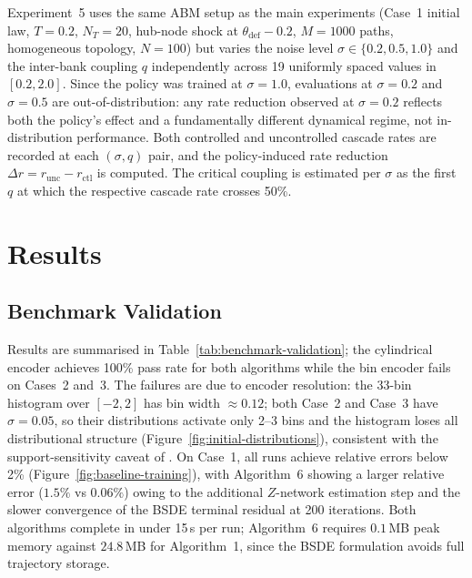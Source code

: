 \documentclass[11pt]{article}
\begin{document}
Experiment~5 uses the same ABM setup as the main experiments (Case~1 initial law, $T = 0.2$, $N_T = 20$, hub-node shock at $\theta_{\mathrm{def}} - 0.2$, $M = 1000$ paths, homogeneous topology, $N = 100$) but varies the noise level $\sigma \in \{0.2, 0.5, 1.0\}$ and the inter-bank coupling $q$ independently across 19 uniformly spaced values in $[0.2, 2.0]$. Since the policy was trained at $\sigma = 1.0$, evaluations at $\sigma = 0.2$ and $\sigma = 0.5$ are out-of-distribution: any rate reduction observed at $\sigma = 0.2$ reflects both the policy's effect and a fundamentally different dynamical regime, not in-distribution performance. Both controlled and uncontrolled cascade rates are recorded at each $( \sigma, q)$ pair, and the policy-induced rate reduction $\Delta r = r_{\mathrm{unc}} - r_{\mathrm{ctl}}$ is computed. The critical coupling is estimated per $\sigma$ as the first $q$ at which the respective cascade rate crosses 50\%.


\section{Results}\label{sec:results}

\subsection{Benchmark Validation}

Results are summarised in Table~\ref{tab:benchmark-validation}; the cylindrical encoder achieves 100\% pass rate for both algorithms while the bin encoder fails on Cases~2 and~3. The failures are due to encoder resolution: the 33-bin histogram over $[-2,2]$ has bin width $\approx 0.12$; both Case~2 and Case~3 have $\sigma = 0.05$, so their distributions activate only 2--3 bins and the histogram loses all distributional structure (Figure~\ref{fig:initial-distributions}), consistent with the support-sensitivity caveat of \citet{pham2024mfnn}. On Case~1, all runs achieve relative errors below 2\% (Figure~\ref{fig:baseline-training}), with Algorithm~6 showing a larger relative error ($1.5\%$ vs $0.06\%$) owing to the additional $Z$-network estimation step and the slower convergence of the BSDE terminal residual at 200 iterations. Both algorithms complete in under 15\,s per run; Algorithm~6 requires $0.1$\,MB peak memory against $24.8$\,MB for Algorithm~1, since the BSDE formulation avoids full trajectory storage.
\end{document}
